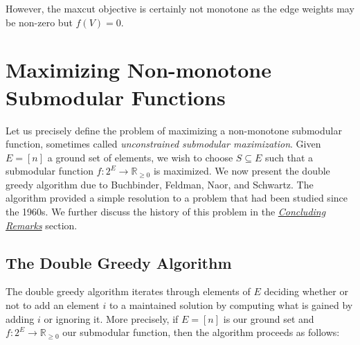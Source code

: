 \documentclass{article}
\begin{document}
However, the maxcut objective is certainly not monotone as the edge weights may be non-zero but $f(V) = 0$.

\section{Maximizing Non-monotone Submodular Functions}

Let us precisely define the problem of maximizing a non-monotone submodular function, sometimes called \emph{unconstrained submodular maximization}. Given $E = [n]$ a ground set of elements, we wish to choose $S \subseteq E$ such that a submodular function $f: 2^E \rightarrow \mathbb{R}_{\geq 0}$ is maximized. We now present the double greedy algorithm due to Buchbinder, Feldman, Naor, and Schwartz. The algorithm provided a simple resolution to a problem that had been studied since the 1960s. We further discuss the history of this problem in the \hyperref[sec:conclusion]{\emph{Concluding Remarks}} section.

\subsection{The Double Greedy Algorithm}

The double greedy algorithm iterates through elements of $E$ deciding whether or not to add an element $i$ to a maintained solution by computing what is gained by adding $i$ or ignoring it. More precisely, if $E = [n]$ is our ground set and $f: 2^E \rightarrow \mathbb{R}_{\geq 0}$ our submodular function, then the algorithm proceeds as follows:
\end{document}
